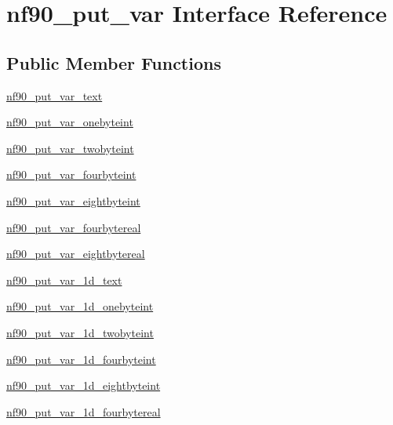\hypertarget{interfacenf90__put__var}{}\section{nf90\+\_\+put\+\_\+var Interface Reference}
\label{interfacenf90__put__var}
\subsection*{Public Member Functions}
\begin{DoxyCompactItemize}
\item 
\hyperlink{interfacenf90__put__var_ad80a2c2a50588d6310250caaf86c18b9}{nf90\+\_\+put\+\_\+var\+\_\+text}
\item 
\hyperlink{interfacenf90__put__var_aaf05711b46f31bfb011ff2e0da4eeec0}{nf90\+\_\+put\+\_\+var\+\_\+onebyteint}
\item 
\hyperlink{interfacenf90__put__var_a1a000a954599635e034347da99fb4af0}{nf90\+\_\+put\+\_\+var\+\_\+twobyteint}
\item 
\hyperlink{interfacenf90__put__var_a98075b1add4296dabf8589cc963b4264}{nf90\+\_\+put\+\_\+var\+\_\+fourbyteint}
\item 
\hyperlink{interfacenf90__put__var_aea94281ada900a76b6c24997296ac5e0}{nf90\+\_\+put\+\_\+var\+\_\+eightbyteint}
\item 
\hyperlink{interfacenf90__put__var_aa3e185a94615dabc8916a14deffbd781}{nf90\+\_\+put\+\_\+var\+\_\+fourbytereal}
\item 
\hyperlink{interfacenf90__put__var_a42421e43ae5cc922d5f6de7c8be8a432}{nf90\+\_\+put\+\_\+var\+\_\+eightbytereal}
\item 
\hyperlink{interfacenf90__put__var_ac37ccbcb8349c56cfd77da77d5b595cc}{nf90\+\_\+put\+\_\+var\+\_\+1d\+\_\+text}
\item 
\hyperlink{interfacenf90__put__var_a28126073edda1e1fbb8726e7b7021733}{nf90\+\_\+put\+\_\+var\+\_\+1d\+\_\+onebyteint}
\item 
\hyperlink{interfacenf90__put__var_a1154b43993ef96a443133f8418bdf071}{nf90\+\_\+put\+\_\+var\+\_\+1d\+\_\+twobyteint}
\item 
\hyperlink{interfacenf90__put__var_acfc81333c7edcbefd8372fe499e03f99}{nf90\+\_\+put\+\_\+var\+\_\+1d\+\_\+fourbyteint}
\item 
\hyperlink{interfacenf90__put__var_adf8f3a8ef72d3d7059c66f870f20f306}{nf90\+\_\+put\+\_\+var\+\_\+1d\+\_\+eightbyteint}
\item 
\hyperlink{interfacenf90__put__var_a6f6b074c58cd3ae73e8a071ac23ded36}{nf90\+\_\+put\+\_\+var\+\_\+1d\+\_\+fourbytereal}

\end{DoxyCompactItemize}
